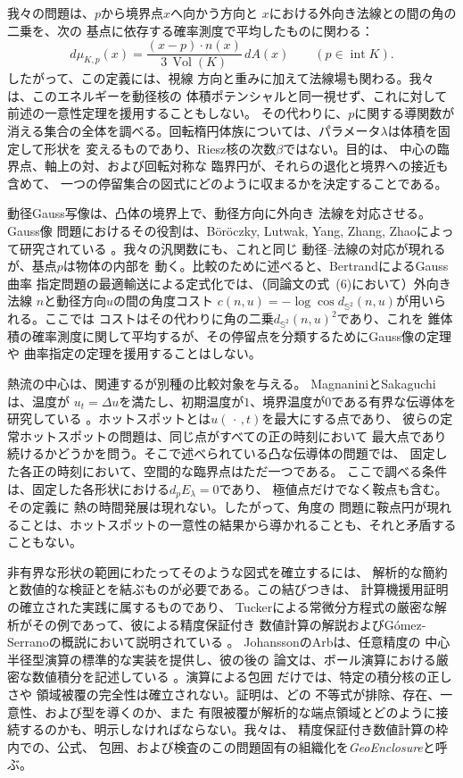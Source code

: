我々の問題は、$p$から境界点$x$へ向かう方向と
$x$における外向き法線との間の角の二乗を、次の
基点に依存する確率測度で平均したものに関わる：
\[
 d\mu_{K,p}(x)
   =\frac{(x-p)\cdot n(x)}{3\,\operatorname{Vol}(K)}\,dA(x)
   \qquad (p\in\operatorname{int}K).
\]
したがって、この定義には、視線
方向と重みに加えて法線場も関わる。我々は、このエネルギーを動径核の
体積ポテンシャルと同一視せず、これに対して前述の一意性定理を援用することもしない。
その代わりに、$p$に関する導関数が
消える集合の全体を調べる。回転楕円体族については、パラメータ$\lambda$は体積を固定して形状を
変えるものであり、Riesz核の次数$\beta$ではない。目的は、
中心の臨界点、軸上の対、および回転対称な
臨界円が、それらの退化と境界への接近も含めて、
一つの停留集合の図式にどのように収まるかを決定することである。

動径Gauss写像は、凸体の境界上で、動径方向に外向き
法線を対応させる。Gauss像
問題におけるその役割は、B\"or\"oczky, Lutwak, Yang, Zhang, Zhaoによって研究されている
\citep{boroczky2020gaussimage}。我々の汎関数にも、これと同じ
動径–法線の対応が現れるが、基点$p$は物体の内部を
動く。比較のために述べると、BertrandによるGauss曲率
指定問題の最適輸送による定式化では、（同論文の式~(6)において）外向き法線
$n$と動径方向$u$の間の角度コスト
$c(n,u)=-\log\cos d_{\mathbb S^2}(n,u)$が用いられる\citep{bertrand2016gauss}。ここでは
コストはその代わりに角の二乗$d_{\mathbb S^2}(n,u)^2$であり、これを
錐体積の確率測度に関して平均するが、その停留点を分類するためにGauss像の定理や
曲率指定の定理を援用することはしない。

熱流の中心は、関連するが別種の比較対象を与える。
MagnaniniとSakaguchiは、温度が
$u_t=\Delta u$を満たし、初期温度が$1$、境界温度が$0$である有界な伝導体を研究している
\citep{magnaniniSakaguchi2004hotspot}。ホットスポットとは$u(\,\cdot\,,t)$を最大にする点であり、
彼らの定常ホットスポットの問題は、同じ点がすべての正の時刻において
最大点であり続けるかどうかを問う。そこで述べられている凸な伝導体の問題では、
固定した各正の時刻において、空間的な臨界点はただ一つである。
ここで調べる条件は、固定した各形状における$d_p E_\lambda=0$であり、
極値点だけでなく鞍点も含む。その定義に
熱の時間発展は現れない。したがって、角度の
問題に鞍点円が現れることは、ホットスポットの一意性の結果から導かれることも、それと矛盾することもない。

非有界な形状の範囲にわたってそのような図式を確立するには、
解析的な簡約と数値的な検証とを結ぶものが必要である。この結びつきは、
計算機援用証明の確立された実践に属するものであり、
Tuckerによる常微分方程式の厳密な解析がその例であって、彼による精度保証付き
数値計算の解説およびG\'omez-Serranoの概説において説明されている
\citep{tucker2002rigorous,tucker2011validated,gomezSerrano2019survey}。
JohanssonのArbは、任意精度の
中心半径型演算の標準的な実装を提供し\citep{johansson2017arb}、彼の後の
論文は、ボール演算における厳密な数値積分を記述している
\citep{johansson2018integration}。演算による包囲
だけでは、特定の積分核の正しさや
領域被覆の完全性は確立されない。証明は、どの
不等式が排除、存在、一意性、および型を導くのか、また
有限被覆が解析的な端点領域とどのように接続するのかも、明示しなければならない。我々は、
精度保証付き数値計算の枠内での、公式、
包囲、および検査のこの問題固有の組織化を\emph{GeoEnclosure}と呼ぶ。


